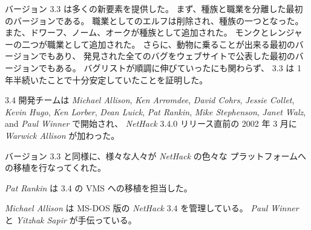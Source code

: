 \medskip
バージョン 3.3 は多くの新要素を提供した。
まず、種族と職業を分離した最初のバージョンである。
職業としてのエルフは削除され、種族の一つとなった。
また、ドワーフ、ノーム、オークが種族として追加された。
モンクとレンジャーの二つが職業として追加された。
さらに、動物に乗ることが出来る最初のバージョンでもあり、
発見された全てのバグをウェブサイトで公表した最初のバージョンでもある。
バグリストが順調に伸びていったにも関わらず、
3.3 は 1 年半続いたことで十分安定していたことを証明した。

\medskip
3.4 開発チームは {\it Michael Allison}, {\it Ken Arromdee},
{\it David Cohrs}, {\it Jessie Collet}, {\it Kevin Hugo}, {\it Ken Lorber},
{\it Dean Luick}, {\it Pat Rankin}, {\it Mike Stephenson}, 
{\it Janet Walz}, and {\it Paul Winner} で開始され、
{\it NetHack\/} 3.4.0 リリース直前の 2002 年 3 月に
{\it Warwick Allison} が加わった。

\medskip
バージョン 3.3 と同様に、様々な人々が {\it NetHack\/} の色々な
プラットフォームへの移植を行なってくれた。

\medskip
{\it Pat Rankin} は 3.4 の VMS への移植を担当した。

\medskip
{\it Michael Allison} は MS-DOS 版の {\it NetHack\/} 3.4 を管理している。
{\it Paul Winner} と {\it Yitzhak Sapir} が手伝っている。

